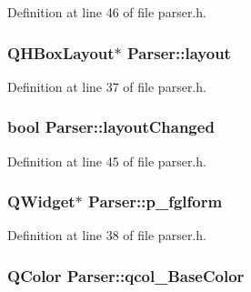 Definition at line 46 of file parser.h.

\hypertarget{classParser_a10b118e730f600194f26db151575c6fa}{
\subsubsection[{layout}]{\setlength{\rightskip}{0pt plus 5cm}QHBoxLayout$\ast$ {\bf Parser::layout}}}
\label{classParser_a10b118e730f600194f26db151575c6fa}


Definition at line 37 of file parser.h.

\hypertarget{classParser_a8088fac11586b6de2df5ed1720f7a943}{
\subsubsection[{layoutChanged}]{\setlength{\rightskip}{0pt plus 5cm}bool {\bf Parser::layoutChanged}}}
\label{classParser_a8088fac11586b6de2df5ed1720f7a943}


Definition at line 45 of file parser.h.

\hypertarget{classParser_a8ae7aeec1e5360fa29b9976624cde0f1}{
\subsubsection[{p\_\-fglform}]{\setlength{\rightskip}{0pt plus 5cm}QWidget$\ast$ {\bf Parser::p\_\-fglform}}}
\label{classParser_a8ae7aeec1e5360fa29b9976624cde0f1}


Definition at line 38 of file parser.h.

\hypertarget{classParser_ade3fc5bc98be3edaf605694661d73693}{
\subsubsection[{qcol\_\-BaseColor}]{\setlength{\rightskip}{0pt plus 5cm}QColor {\bf Parser::qcol\_\-BaseColor}}}
\label{classParser_ade3fc5bc98be3edaf605694661d73693}


